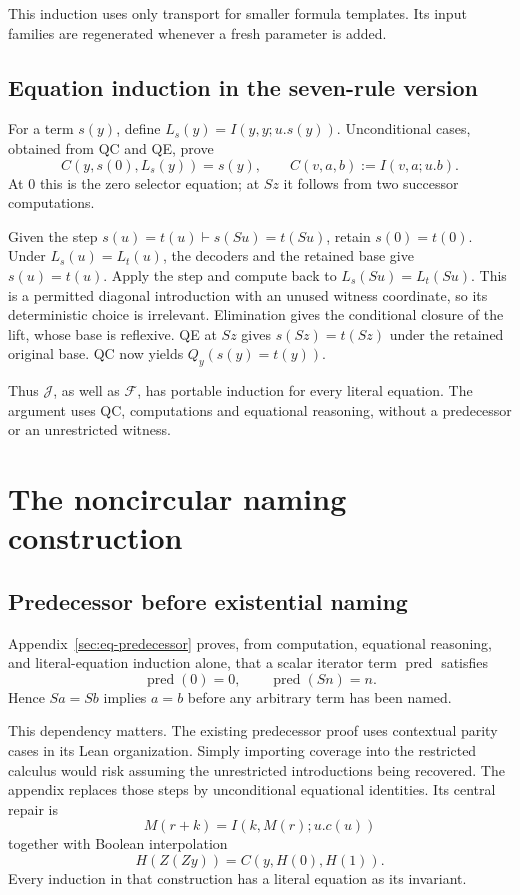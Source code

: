\documentclass[11pt]{article}
\newcommand{\Fcal}{\mathcal F}
\newcommand{\Jcal}{\mathcal J}
\newcommand{\pred}{\operatorname{pred}}
\begin{document}
This induction uses only transport for smaller formula templates.
Its input families are regenerated whenever a fresh parameter is added.

\subsection{Equation induction in the seven-rule version}

For a term \(s(y)\), define \(L_s(y)=I(y,y;u.s(y))\).
Unconditional cases, obtained from QC and QE, prove
\[
 C(y,s(0),L_s(y))=s(y),
 \qquad C(v,a,b):=I(v,a;u.b).
 \tag{Dec}
\]
At \(0\) this is the zero selector equation; at \(Sz\) it follows from
two successor computations.

Given the step \(s(u)=t(u)\vdash s(Su)=t(Su)\), retain \(s(0)=t(0)\).
Under \(L_s(u)=L_t(u)\), the decoders and the retained base give
\(s(u)=t(u)\). Apply the step and compute back to
\(L_s(Su)=L_t(Su)\).
This is a permitted diagonal introduction with an unused witness coordinate,
so its deterministic choice is irrelevant. Elimination gives the conditional
closure of the lift, whose base is reflexive. QE at \(Sz\) gives
\(s(Sz)=t(Sz)\) under the retained original base. QC now yields
\(Q_y(s(y)=t(y))\).

Thus \(\Jcal\), as well as \(\Fcal\), has portable induction for every
literal equation. The argument uses QC, computations and equational
reasoning, without a predecessor or an unrestricted witness.

\section{The noncircular naming construction}\label{sec:names}

\subsection{Predecessor before existential naming}

Appendix~\ref{sec:eq-predecessor} proves, from computation,
equational reasoning, and literal-equation induction alone, that a scalar
iterator term \(\pred\) satisfies
\[
 \pred(0)=0,\qquad \pred(Sn)=n.
 \tag{P}
\]
Hence \(Sa=Sb\) implies \(a=b\) before any arbitrary term has been named.

This dependency matters. The existing predecessor proof uses contextual
parity cases in its Lean organization. Simply importing coverage into the
restricted calculus would risk assuming the unrestricted introductions being
recovered. The appendix replaces those steps by unconditional equational
identities. Its central repair is
\[
 M(r+k)=I(k,M(r);u.c(u))
\]
together with Boolean interpolation
\[
 H(Z(Zy))=C(y,H(0),H(1)).
\]
Every induction in that construction has a literal equation as its invariant.
\end{document}

